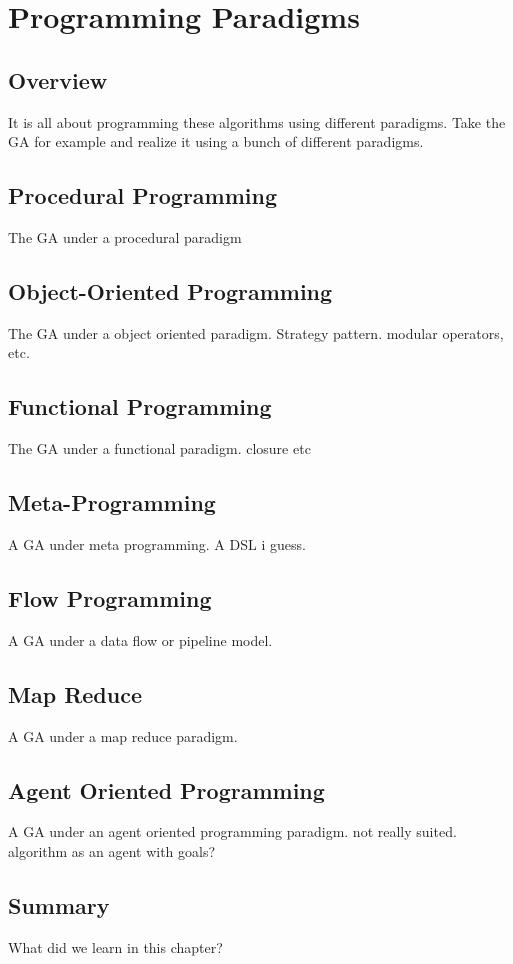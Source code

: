 \chapter{Programming Paradigms}
\label{chap:paradigms}

\section{Overview}
It is all about programming these algorithms using different paradigms.
Take the GA for example and realize it using a bunch of different paradigms.

\section{Procedural Programming}
The GA under a procedural paradigm

\section{Object-Oriented Programming}
The GA under a object oriented paradigm. Strategy pattern. modular operators, etc.

\section{Functional Programming}
The GA under a functional paradigm. closure etc

\section{Meta-Programming}
A GA under meta programming. A DSL i guess.

\section{Flow Programming}
A GA under a data flow or pipeline model.

\section{Map Reduce}
A GA under a map reduce paradigm.

\section{Agent Oriented Programming}
A GA under an agent oriented programming paradigm. not really suited. algorithm as an agent with goals?



\section{Summary}
What did we learn in this chapter?